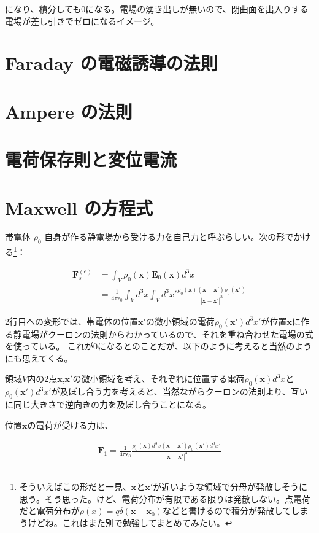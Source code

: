 \documentclass[a4j,12pt,uplatex,dvipdfmx]{jsreport}
\begin{document}
になり、積分しても$0$になる。電場の湧き出しが無いので、閉曲面を出入りする電場が差し引きでゼロになるイメージ。
\section{Faraday の電磁誘導の法則}

\section{Ampere の法則}

\section{電荷保存則と変位電流}

\section{Maxwell の方程式}

帯電体 $\rho_0$ 自身が作る静電場から受ける力を自己力と呼ぶらしい。次の形でかける\footnote{そういえばこの形だと一見、$\bm{x}$と$\bm{x'}$が近いような領域で分母が発散しそうに思う。そう思った。けど、電荷分布が有限である限りは発散しない。点電荷だと電荷分布が$\rho (x) = q \delta(\bm{x} - \bm{x}_0)$などと書けるので積分が発散してしまうけどね。これはまた別で勉強してまとめてみたい。}：

\begin{align*}
  \bm{F}^{(e)}_{s}
  &= \int_{V} \rho_0(\bm{x}) \bm{E}_0(\bm{x}) d^3 x \\
  &= \frac{1}{4 \pi \epsilon_0} \int_V d^3 x \int_V d^3 x' \frac{\rho_0(\bm{x}) (\bm{x} - \bm{x'}) \rho_0(\bm{x'})}{| \bm{x} - \bm{x'} |^3}
\end{align*}

2行目への変形では、帯電体の位置$\bm{x'}$の微小領域の電荷$\rho_0(\bm{x'}) d^3 x'$が位置$\bm{x}$に作る静電場がクーロンの法則からわかっているので、それを重ね合わせた電場の式を使っている。
これが$0$になるとのことだが、以下のように考えると当然のようにも思えてくる。

領域$V$内の2点$\bm{x}$,$\bm{x'}$の微小領域を考え、それぞれに位置する電荷$\rho_0(\bm{x})d^3x$と$\rho_0(\bm{x'})d^3x'$が及ぼし合う力を考えると、当然ながらクーロンの法則より、互いに同じ大きさで逆向きの力を及ぼし合うことになる。

位置$\bm{x}$の電荷が受ける力は、

\begin{align*}
  \bm{F}_1 = \frac{1}{4 \pi \epsilon_0}  \frac{\rho_0(\bm{x})d^3 x (\bm{x} - \bm{x'}) \rho_0(\bm{x'}) d^3 x'}{| \bm{x} - \bm{x'} |^3}
\end{align*}
\end{document}
